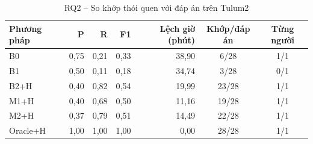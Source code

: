 \begin{table}[htbp]
\centering
\caption{RQ2 -- So khớp thói quen với đáp án trên Tulum2}
\label{tab:rq2-tulum2}
\small
\begin{tabular}{lrrrrcc}
\toprule
Phương pháp & P & R & F1 & Lệch giờ (phút) & Khớp/đáp án & Từng người \\
\midrule
B0 & 0{,}75 & 0{,}21 & 0{,}33 & 38{,}90 & 6/28 & 1/1 \\
B1 & 0{,}50 & 0{,}11 & 0{,}18 & 34{,}74 & 3/28 & 0/1 \\
B2+H & 0{,}40 & 0{,}82 & 0{,}54 & 19{,}99 & 23/28 & 1/1 \\
M1+H & 0{,}40 & 0{,}68 & 0{,}50 & 11{,}16 & 19/28 & 1/1 \\
M2+H & 0{,}37 & 0{,}79 & 0{,}51 & 14{,}49 & 22/28 & 1/1 \\
Oracle+H & 1{,}00 & 1{,}00 & 1{,}00 & 0{,}00 & 28/28 & 1/1 \\
\bottomrule
\end{tabular}
\end{table}
